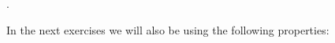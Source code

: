 \cite{kamen2000fundamentals}.

In the next exercises we will also be using the following properties:

